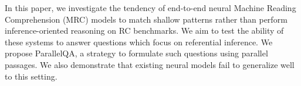 In this paper, we investigate the tendency of end-to-end neural Machine Reading Comprehension (MRC) models to match shallow patterns rather than perform inference-oriented reasoning on RC benchmarks. We aim to test the ability of these systems to answer questions which focus on referential inference. We propose ParallelQA, a strategy to formulate such questions using parallel passages. We also demonstrate that existing neural models fail to generalize well to this setting.
